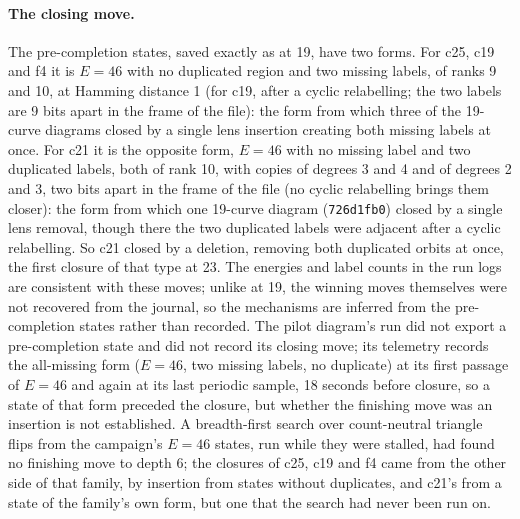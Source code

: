 \documentclass[11pt]{article}
\begin{document}
\paragraph{The closing move.} The pre-completion states, saved exactly as at 19, have two forms. For c25, c19 and f4
it is $E=46$ with no duplicated region and two missing labels, of ranks 9 and 10, at Hamming distance 1 (for c19, after
a cyclic relabelling; the two labels are 9 bits apart in the frame of the file): the form from which three of the
19-curve diagrams closed by a single lens insertion creating both missing labels at once. For c21 it is the opposite
form, $E=46$ with no missing label and two duplicated labels, both of rank 10, with copies of degrees 3 and 4 and of
degrees 2 and 3, two bits apart in the frame of the file (no cyclic relabelling brings them closer): the form from which one 19-curve diagram
(\texttt{726d1fb0}) closed by a single lens removal, though there the two duplicated labels were adjacent after a cyclic
relabelling. So c21 closed by a deletion, removing both duplicated orbits at once, the first closure of that type at 23.
The energies and label counts in the run logs are consistent with these moves; unlike at 19, the winning moves
themselves were not recovered from the journal, so the mechanisms are inferred from the pre-completion states rather
than recorded. The pilot diagram's run did not export a pre-completion state and did not record its closing move;
its telemetry records the all-missing form ($E=46$, two missing labels, no duplicate) at its first passage of $E=46$
and again at its last periodic sample, 18 seconds before closure, so a state of that form preceded the closure, but
whether the finishing move was an insertion is not established. A breadth-first search over count-neutral triangle
flips from the campaign's $E=46$ states, run while
they were stalled, had found no finishing move to depth 6; the closures of c25, c19 and f4 came from the other side of
that family, by insertion from states without duplicates, and c21's from a state of the family's own form, but one that
the search had never been run on.
\end{document}
